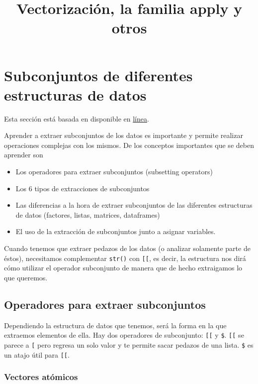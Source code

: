 \documentclass[]{article}
\title{Vectorización, la familia apply y otros}
\author{}
\date{}
\begin{document}
\maketitle


\section{Subconjuntos de diferentes estructuras de
datos}\label{subconjuntos-de-diferentes-estructuras-de-datos}

Esta sección está basada en \textcite[Subsetting]{wickham2014advanced}
disponible en
\href{http://adv-r.had.co.nz/Subsetting.html\#subsetting-operators}{línea}.

Aprender a extraer subconjuntos de los datos es importante y permite
realizar operaciones complejas con los mismos. De los conceptos
importantes que se deben aprender son

\begin{itemize}
\itemsep1pt\parskip0pt
\item
  Los operadores para extraer subconjuntos (subsetting operators)
\item
  Los 6 tipos de extracciones de subconjuntos
\item
  Las diferencias a la hora de extraer subconjuntos de las diferentes
  estructuras de datos (factores, listas, matrices, dataframes)
\item
  El uso de la extracción de subconjuntos junto a asignar variables.
\end{itemize}

Cuando tenemos que extraer pedazos de los datos (o analizar solamente
parte de éstos), necesitamos complementar \texttt{str()} con
\texttt{{[}{[}}, es decir, la estructura nos dirá cómo utilizar el
operador subconjunto de manera que de hecho extraigamos lo que queremos.

\subsection{Operadores para extraer
subconjuntos}\label{operadores-para-extraer-subconjuntos}

Dependiendo la estructura de datos que tenemos, será la forma en la que
extraemos elementos de ella. Hay dos operadores de subconjunto:
\texttt{{[}{[}} y \texttt{\$}. \texttt{{[}{[}} se parece a \texttt{{[}}
pero regresa un solo valor y te permite sacar pedazos de una lista.
\texttt{\$} es un atajo útil para \texttt{{[}{[}}.

\subsubsection{Vectores atómicos}\label{vectores-atomicos}
\end{document}
